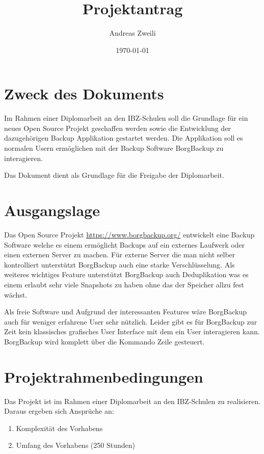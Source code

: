\documentclass[a4paper,11pt]{article}
\author{Andreas Zweili}
\date{\today}
\title{Projektantrag}
\begin{document}
\maketitle\newpage
\tableofcontents
\newpage

\section{Zweck des Dokuments}
\label{sec:org94b8dea}
Im Rahmen einer Diplomarbeit an den IBZ-Schulen soll die Grundlage für
ein neues Open Source Projekt geschaffen werden sowie die Entwicklung
der dazugehörigen Backup Applikation gestartet werden. Die Applikation
soll es normalen Usern ermöglichen mit der Backup Software BorgBackup
zu interagieren.

Das Dokument dient als Grundlage für die Freigabe der Diplomarbeit.

\section{Ausgangslage}
\label{sec:org42ce4b5}

Das Open Source Projekt \url{https://www.borgbackup.org/} entwickelt eine
Backup Software welche es einem ermöglicht Backups auf ein externes
Laufwerk oder einen externen Server zu machen. Für externe Server die
man nicht selber kontrolliert unterstützt BorgBackup auch eine starke
Verschlüsselung. Als weiteres wichtiges Feature unterstützt BorgBackup
auch Deduplikation was es einem erlaubt sehr viele Snapshots zu haben
ohne das der Speicher allzu fest wächst.

Als freie Software und Aufgrund der interessanten Features wäre
BorgBackup auch für weniger erfahrene User sehr nützlich. Leider gibt
es für BorgBackup zur Zeit kein klassisches grafisches User Interface
mit dem ein User interagieren kann. BorgBackup wird komplett über die
Kommando Zeile gesteuert.

\section{Projektrahmenbedingungen}
\label{sec:org8a07e68}

Das Projekt ist im Rahmen einer Diplomarbeit an den IBZ-Schulen zu
realisieren. Daraus ergeben sich Ansprüche an:

\begin{enumerate}
\item Komplexität des Vorhabens
\item Umfang des Vorhabens (250 Stunden)
\end{enumerate}
\end{document}
